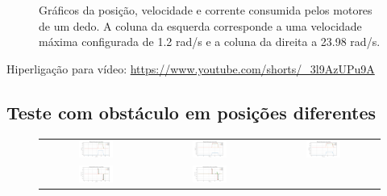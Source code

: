 \begin{figure}[H]
\begin{tabular}{ccc}
\end{tabular}
\caption{Gráficos da posição, velocidade e corrente consumida pelos motores de um dedo. A coluna da esquerda corresponde a uma velocidade máxima configurada de 1.2 rad/s e a coluna da direita a 23.98 rad/s.}
\end{figure}

Hiperligação para vídeo: \url{https://www.youtube.com/shorts/_3l9AzUPu9A}

\label{appendix:teste_velocidades}

\subsection{Teste com obstáculo em posições diferentes}

\begin{figure}[H]
\centering
\begin{tabular}{ccc}
  \includegraphics[width=0.33\textwidth]{figs/appendix/teste_pos_obst/finger_pos_vel50_obs_motor1.png} &
  \includegraphics[width=0.33\textwidth]{figs/appendix/teste_pos_obst/finger_pos_vel50_obs_motor2.png} &
  \includegraphics[width=0.33\textwidth]{figs/appendix/teste_pos_obst/finger_pos_vel50_obs_ponta.png} \\
  \includegraphics[width=0.33\textwidth]{figs/appendix/teste_pos_obst/finger_vels_vel50_obs_motor1.png} &
  \includegraphics[width=0.33\textwidth]{figs/appendix/teste_pos_obst/finger_vels_vel50_obs_motor2.png} &

\end{tabular}
\end{figure}
